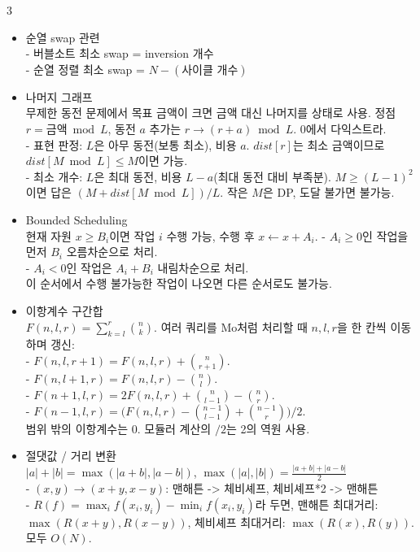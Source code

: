 \documentclass[landscape, 8pt, a4paper, oneside]{extarticle}
\begin{document}
\begin{multicols*}{3}
\begin{itemize}
    (imos는 마지막에 누적합 2번 적용: 행 방향, 열 방향)
    \item 순열 swap 관련\\
    - 버블소트 최소 swap = inversion 개수\\
    - 순열 정렬 최소 swap = $N - (\text{사이클 개수})$
    \item 나머지 그래프\\
    무제한 동전 문제에서 목표 금액이 크면 금액 대신 나머지를 상태로 사용. 정점 $r=\text{금액}\bmod L$, 동전 $a$ 추가는 $r\to(r+a)\bmod L$. 0에서 다익스트라.\\
    - 표현 판정: $L$은 아무 동전(보통 최소), 비용 $a$. $dist[r]$는 최소 금액이므로 $dist[M\bmod L]\le M$이면 가능.\\
    - 최소 개수: $L$은 최대 동전, 비용 $L-a$(최대 동전 대비 부족분). $M\ge(L-1)^2$이면 답은 $(M+dist[M\bmod L])/L$. 작은 $M$은 DP, 도달 불가면 불가능.
    \item Bounded Scheduling\\
    현재 자원 $x\ge B_i$이면 작업 $i$ 수행 가능, 수행 후 $x\leftarrow x+A_i$.
    - $A_i\ge0$인 작업을 먼저 $B_i$ 오름차순으로 처리.\\
    - $A_i<0$인 작업은 $A_i+B_i$ 내림차순으로 처리.\\
    이 순서에서 수행 불가능한 작업이 나오면 다른 순서로도 불가능.
    \item 이항계수 구간합\\
    $F(n,l,r)=\sum_{k=l}^{r}\binom{n}{k}$. 여러 쿼리를 Mo처럼 처리할 때 $n,l,r$을 한 칸씩 이동하며 갱신:\\
    - $F(n,l,r+1)=F(n,l,r)+\binom{n}{r+1}$.\\
    - $F(n,l+1,r)=F(n,l,r)-\binom{n}{l}$.\\
    - $F(n+1,l,r)=2F(n,l,r)+\binom{n}{l-1}-\binom{n}{r}$.\\
    - $F(n-1,l,r)=\bigl(F(n,l,r)-\binom{n-1}{l-1}+\binom{n-1}{r}\bigr)/2$.\\
    범위 밖의 이항계수는 0. 모듈러 계산의 $/2$는 2의 역원 사용.
    \item 절댓값 / 거리 변환\\
    $|a|+|b|=\max(|a+b|,|a-b|)$, $\max(|a|,|b|)=\frac{|a+b|+|a-b|}{2}$\\
    - $(x,y)\to(x+y,x-y)$: 맨해튼 -> 체비셰프, 체비셰프*2 -> 맨해튼\\
    - $R(f)=\max_i f(x_i,y_i)-\min_i f(x_i,y_i)$라 두면, 맨해튼 최대거리: $\max(R(x+y),R(x-y))$, 체비셰프 최대거리: $\max(R(x),R(y))$. 모두 $O(N)$.
  \end{itemize}
  

\end{multicols*}
\end{document}
